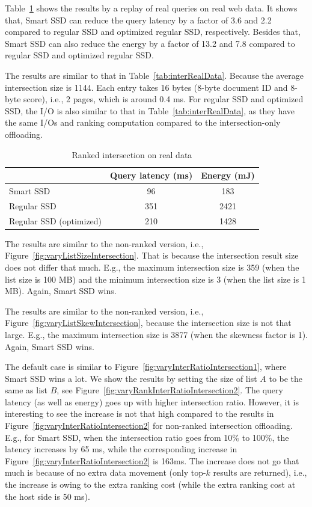Table~\ref{tab:rankInterRealData} shows the results by a replay of real queries on real web data. It shows that, Smart SSD  can reduce the query latency by a factor of 3.6 and 2.2 compared to regular SSD and optimized regular SSD, respectively. Besides that, Smart SSD can also reduce the energy by a factor of 13.2 and 7.8 compared to regular SSD and optimized regular SSD.

The results are similar to that in Table~\ref{tab:interRealData}. Because the average intersection size is 1144. Each entry takes 16 bytes (8-byte document ID and 8-byte score), i.e., 2 pages, which is around 0.4 ms. For regular SSD and optimized SSD, the I/O is also similar to that in Table~\ref{tab:interRealData}, as they have the same I/Os and ranking computation compared to the intersection-only offloading.

\begin{table}[tbp]\small
\centering
\begin{tabular}{l|c|c}\hline\hline
& \textbf{Query latency (ms)} & \textbf{Energy (mJ)}\\\hline
Smart SSD & 96 & 183\\\hline
Regular SSD & 351 & 2421\\\hline
Regular SSD (optimized) & 210 & 1428 \\\hline\hline
\end{tabular}
\caption{Ranked intersection on real data}\label{tab:rankInterRealData}
\end{table}

The results are similar to the non-ranked version, i.e., Figure~\ref{fig:varyListSizeIntersection}. That is because the intersection result size does not differ that much. E.g., the maximum intersection size is 359 (when the list size is 100 MB) and the minimum intersection size is 3 (when the list size is 1 MB). Again, Smart SSD wins.


The results are similar to the non-ranked version, i.e., Figure~\ref{fig:varyListSkewIntersection}, because the intersection size is not that large. E.g., the maximum intersection size is 3877 (when the skewness factor is 1). Again, Smart SSD wins.

The default case is similar to Figure~\ref{fig:varyInterRatioIntersection1}, where Smart SSD wins a lot. We show the results by setting the size of list $A$ to be the same as list $B$, see Figure~\ref{fig:varyRankInterRatioIntersection2}. The query latency (as well as energy) goes up with higher intersection ratio. However, it is interesting to see the increase is not that high compared to the results in Figure~\ref{fig:varyInterRatioIntersection2} for non-ranked intersection offloading. E.g., for Smart SSD, when the intersection ratio goes from 10\% to 100\%, the latency increases by 65 ms, while the corresponding increase in Figure~\ref{fig:varyInterRatioIntersection2} is 163ms. The increase does not go that much is because of no extra data movement (only top-$k$ results are returned), i.e., the increase is owing to the extra ranking cost (while the extra ranking cost at the host side is 50 ms).

